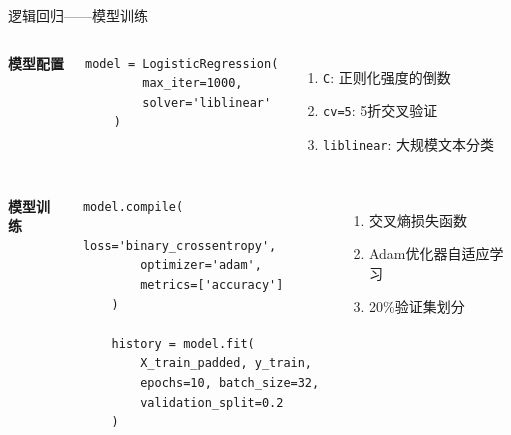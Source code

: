 \documentclass{beamer}
\begin{document}
\begin{frame}[fragile]{逻辑回归——模型训练}
    \begin{columns}
        \textbf{模型配置}
        \begin{lstlisting}[style=pythonstyle, basicstyle=\tiny]
    model = LogisticRegression(
        max_iter=1000,
        solver='liblinear'
    )
        \end{lstlisting}

        \begin{enumerate}
            \item \texttt{C}: 正则化强度的倒数
            \item \texttt{cv=5}: 5折交叉验证
            \item \texttt{liblinear}: 大规模文本分类
        \end{enumerate}
    \end{columns}

    \begin{columns}
        \textbf{模型训练}
        \begin{lstlisting}[style=pythonstyle, basicstyle=\tiny]
    model.compile(
        loss='binary_crossentropy',
        optimizer='adam',
        metrics=['accuracy']
    )

    history = model.fit(
        X_train_padded, y_train,
        epochs=10, batch_size=32,
        validation_split=0.2
    )
        \end{lstlisting}

        \begin{enumerate}
            \item 交叉熵损失函数
            \item Adam优化器自适应学习
            \item 20\%验证集划分
        \end{enumerate}
    \end{columns}
\end{frame}
\end{document}
